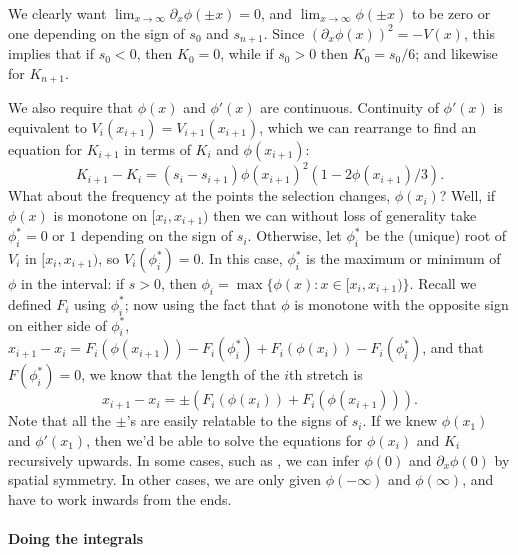 \documentclass[10pt,letterpaper]{article}
\newcommand{\citet}[1]{\cite{#1}}
\begin{document}
We clearly want $\lim_{x \to \infty} \partial_x \phi(\pm x) = 0$, 
and $\lim_{x \to \infty} \phi(\pm x)$ to be zero or one depending on the sign of $s_0$ and $s_{n+1}$.
Since $(\partial_x \phi(x))^2 = -V(x)$, this implies that if $s_0<0$, then $K_0 = 0$,
while if $s_0>0$ then $K_0 = s_0/6$; and likewise for $K_{n+1}$.

We also require that $\phi(x)$ and $\phi'(x)$ are continuous.
Continuity of $\phi'(x)$ is equivalent to $V_i(x_{i+1}) = V_{i+1}(x_{i+1})$,
which we can rearrange to find an equation for $K_{i+1}$ in terms of $K_i$ and $\phi(x_{i+1})$:
\[
    K_{i+1} - K_i = (s_i - s_{i+1}) \phi(x_{i+1})^2 (1-2\phi(x_{i+1})/3) .
\]
What about the frequency at the points the selection changes, $\phi(x_i)$?  
Well, if $\phi(x)$ is monotone on $[x_i,x_{i+1})$ then we can without loss of generality take $\phi_i^*=0$ or $1$ depending on the sign of $s_i$.
Otherwise, let $\phi_i^*$ be the (unique) root of $V_i$ in $[x_i,x_{i+1})$, so $V_i(\phi_i^*)=0$.
In this case, $\phi_i^*$ is the maximum or minimum of $\phi$ in the interval:
if $s>0$, then $\phi_i = \max\{ \phi(x) : x \in [x_i,x_{i+1})\}$. 
Recall we defined $F_i$ using $\phi_i^*$; now using the fact that $\phi$ is monotone with the opposite sign on either side of $\phi_i^*$,
$x_{i+1} - x_i = F_i(\phi(x_{i+1})) - F_i(\phi_i^*) + F_i(\phi(x_{i})) - F_i(\phi_i^*)$,
and that $F(\phi_i^*) = 0$,
we know that the length of the $i$th stretch is
\[
    x_{i+1} - x_i = \pm \left( F_i(\phi(x_i)) + F_i(\phi(x_{i+1})) \right).
\]
Note that all the $\pm{}$'s are easily relatable to the signs of $s_i$.
If we knew $\phi(x_1)$ and $\phi'(x_1)$, then we'd be able to solve the equations for $\phi(x_i)$ and $K_i$ recursively upwards.
In some cases, such as \citet{slatkin1973geneflow}, we can infer $\phi(0)$ and $\partial_x \phi(0)$ by spatial symmetry.
In other cases, we are only given $\phi(-\infty)$ and $\phi(\infty)$, and have to work inwards from the ends.


\paragraph{Doing the integrals}
\label{apx:some_integrals}
\end{document}

